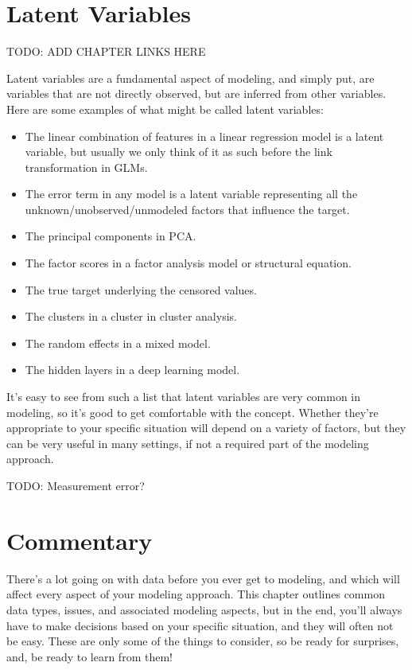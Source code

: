 \documentclass[
  letterpaper,
]{krantz}
\providecommand{\tightlist}{%
  \setlength{\itemsep}{0pt}\setlength{\parskip}{0pt}}\usepackage{longtable,booktabs,array}
\begin{document}
\section{Latent Variables}\label{sec-data-latent}

TODO: ADD CHAPTER LINKS HERE

Latent variables are a fundamental aspect of modeling, and simply put,
are variables that are not directly observed, but are inferred from
other variables. Here are some examples of what might be called latent
variables:

\begin{itemize}
\tightlist
\item
  The linear combination of features in a linear regression model is a
  latent variable, but usually we only think of it as such before the
  link transformation in GLMs.
\item
  The error term in any model is a latent variable representing all the
  unknown/unobserved/unmodeled factors that influence the target.
\item
  The principal components in PCA.
\item
  The factor scores in a factor analysis model or structural equation.
\item
  The true target underlying the censored values.
\item
  The clusters in a cluster in cluster analysis.
\item
  The random effects in a mixed model.
\item
  The hidden layers in a deep learning model.
\end{itemize}

It's easy to see from such a list that latent variables are very common
in modeling, so it's good to get comfortable with the concept. Whether
they're appropriate to your specific situation will depend on a variety
of factors, but they can be very useful in many settings, if not a
required part of the modeling approach.

TODO: Measurement error?

\section{Commentary}\label{commentary-2}

There's a lot going on with data before you ever get to modeling, and
which will affect every aspect of your modeling approach. This chapter
outlines common data types, issues, and associated modeling aspects, but
in the end, you'll always have to make decisions based on your specific
situation, and they will often not be easy. These are only some of the
things to consider, so be ready for surprises, and, be ready to learn
from them!
\end{document}
